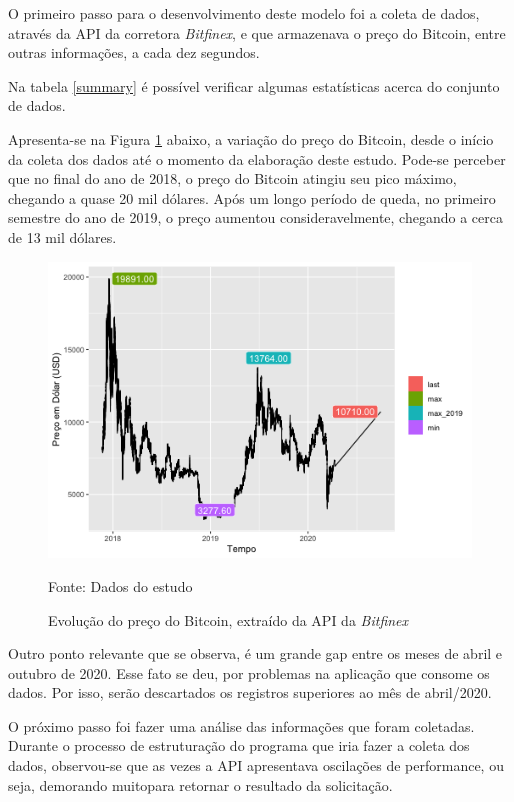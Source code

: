 \documentclass[12pt]{article}
\begin{document}
O primeiro passo para o desenvolvimento deste modelo foi a coleta de dados, 
através da API da corretora \textit{Bitfinex}, e que armazenava o preço do 
Bitcoin, entre outras informações, a cada dez segundos.

Na tabela \ref{summary} é possível verificar algumas estatísticas acerca do 
conjunto de dados.



Apresenta-se na Figura \ref{fig:data-hist} abaixo, a variação do preço do 
Bitcoin, desde o início da coleta dos dados até o momento da elaboração deste 
estudo. Pode-se perceber que no final do ano de 2018, o preço do Bitcoin atingiu 
seu pico máximo, chegando a quase 20 mil dólares. Após um longo período de 
queda, no primeiro semestre do ano de 2019, o preço aumentou consideravelmente, 
chegando a cerca de 13 mil dólares.


\begin{figure}[ht]
  \centering
  \includegraphics[scale = 0.8]{img/data-hist.png}
  \caption{Evolução do preço do Bitcoin, extraído da API da \textit{Bitfinex}}
  Fonte: Dados do estudo
  \label{fig:data-hist}
\end{figure}


Outro ponto relevante que se observa, é um grande gap entre os meses de 
abril e outubro de 2020. Esse fato se deu, por problemas na aplicação que 
consome os dados. Por isso, serão descartados os registros superiores ao mês 
de abril/2020.

O próximo passo foi fazer uma análise das informações que foram coletadas. 
Durante o processo de estruturação do programa que iria fazer a coleta dos 
dados, observou-se que as vezes a API apresentava oscilações de performance, 
ou seja, demorando muitopara retornar o resultado da solicitação.
\end{document}
